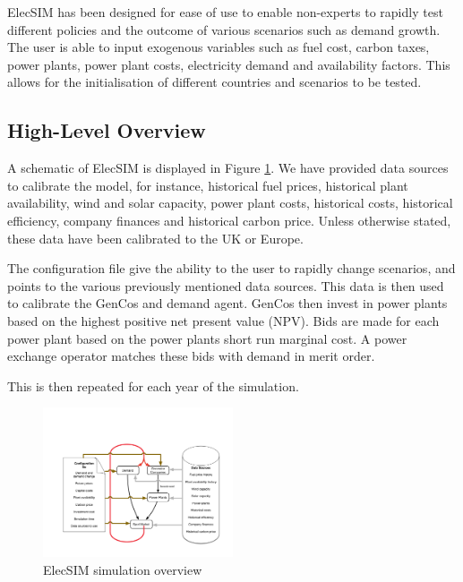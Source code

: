 
ElecSIM has been designed for ease of use to enable non-experts to rapidly test different policies and the outcome of various scenarios such as demand growth. The user is able to input exogenous variables such as fuel cost, carbon taxes, power plants, power plant costs, electricity demand and availability factors. This allows for the initialisation of different countries and scenarios to be tested.


\subsection{High-Level Overview}

A schematic of ElecSIM is displayed in Figure \ref{fig:system_overview}. We have provided data sources to calibrate the model, for instance, historical fuel prices, historical plant availability, wind and solar capacity, power plant costs, historical costs, historical efficiency, company finances and historical carbon price. Unless otherwise stated, these data have been calibrated to the UK or Europe.

The configuration file give the ability to the user to rapidly change scenarios, and points to the various previously mentioned data sources. This data is then used to calibrate the GenCos and demand agent. GenCos then invest in power plants based on the highest positive net present value (NPV). Bids are made for each power plant based on the power plants short run marginal cost. A power exchange operator matches these bids with demand in merit order. 

This is then repeated for each year of the simulation.


\begin{figure}[h]
	\begin{center}
		\includegraphics[width=0.5\textwidth]{figures/System_overview.pdf}
		\caption{ElecSIM simulation overview}
		\label{fig:system_overview}
	\end{center}
\end{figure}

